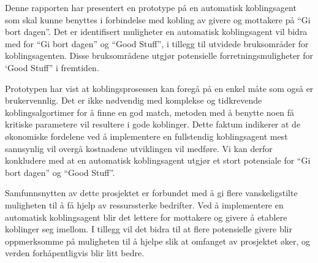 Denne rapporten har presentert en prototype på en automatisk koblingsagent som skal kunne benyttes i forbindelse med kobling av givere og mottakere på ``Gi bort dagen''. Det er identifisert muligheter en automatisk koblingsagent vil bidra med for ``Gi bort dagen'' og ``Good Stuff'', i tillegg til utvidede bruksområder for koblingsagenten. Disse bruksområdene utgjør potensielle forretningsmuligheter for `Good Stuff” i fremtiden.

Prototypen har vist at koblingsprosessen kan foregå på en enkel måte som også er brukervennlig. Det er ikke nødvendig med komplekse og tidkrevende koblingsalgortimer for å finne en god match, metoden med å benytte noen få kritiske parametere vil resultere i gode koblinger. Dette faktum indikerer at de økonomiske fordelene ved å implementere en fullstendig koblingsagent mest sannsynlig vil overgå kostnadene utviklingen vil medføre. Vi kan derfor konkludere med at en automatisk koblingsagent utgjør et stort potensiale for ``Gi bort dagen'' og ``Good Stuff''. 

Samfunnsnytten av dette prosjektet er forbundet med å gi flere vanskeligstilte muligheten til å få hjelp av ressurssterke bedrifter. Ved å implementere en automatisk koblingsagent blir det lettere for mottakere og givere å etablere koblinger seg imellom. I tillegg vil det bidra til at flere potensielle givere blir oppmerksomme på muligheten til å hjelpe slik at omfanget av prosjektet øker, og verden forhåpentligvis blir litt bedre. 
